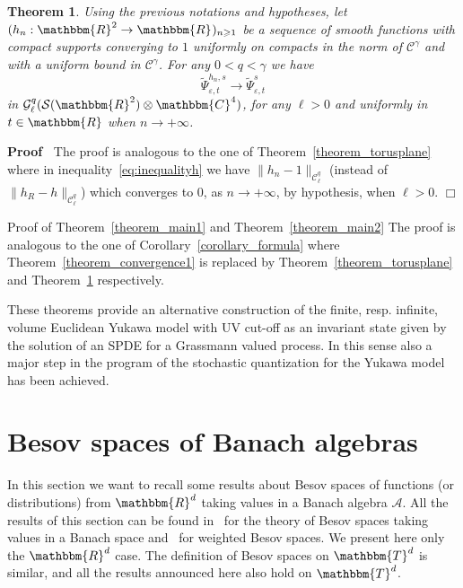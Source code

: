 \documentclass[11pt]{article}
\newenvironment{proof}{\noindent\textbf{Proof\ }}{\hspace*{\fill}$\Box$\medskip}
\newenvironment{proof*}[1]{\noindent\textbf{#1\ }}{\hspace*{\fill}$\Box$\medskip}
\newtheorem{theorem}{Theorem}
\begin{document}
\begin{theorem}
  \label{theorem_cutoffh}Using the previous notations and hypotheses, let
  $(h_n : \mathbbm{R}^2 \rightarrow \mathbbm{R}^{}_{})_{n \geqslant 1}$ be a
  sequence of smooth functions with compact supports converging to $1$
  uniformly on compacts in the norm of $\mathcal{C}^{\gamma}$ and with a
  uniform bound in $\mathcal{C}^{\gamma}$. For any $0 < q < \gamma$ we have
  \[ \tilde{\Psi}_{\varepsilon, t}^{h_n, s} \rightarrow
     \tilde{\Psi}_{\varepsilon, t}^s \]
  in $\mathcal{G}^q_{\ell} (\mathcal{S} (\mathbbm{R}^2) \otimes \mathbbm{C}^4)$,
  for any $\ell > 0$ and uniformly in $t \in \mathbbm{R}$ when $n \rightarrow +
  \infty$.
\end{theorem}

\begin{proof}
  The proof is analogous to the one of Theorem~\ref{theorem_torusplane} where
  in inequality~{\eqref{eq:inequalityh}} we have $\| h_n - 1
  \|_{\mathcal{C}^q_{\ell}}$ (instead of $\| h_R - h
  \|_{\mathcal{C}^q_{\ell}}$) which converges to $0$, as $n \rightarrow +
  \infty$, by hypothesis, when $\ell > 0$.
\end{proof}

\begin{proof*}{Proof of Theorem~\ref{theorem_main1} and
Theorem~\ref{theorem_main2}}
  The proof is analogous to the one of Corollary~\ref{corollary_formula} where
  Theorem~\ref{theorem_convergence1} is replaced by
  Theorem~\ref{theorem_torusplane} and Theorem~\ref{theorem_cutoffh}
  respectively.
\end{proof*}

These theorems provide an alternative construction of the finite, resp.
infinite, volume Euclidean Yukawa model with UV cut-off as an invariant state
given by the solution of an SPDE for a Grassmann valued process. In this sense
also a major step in the program of the stochastic quantization for the Yukawa
model has been achieved.

\appendix\section{Besov spaces of Banach algebras}\label{appendix_Besov}

In this section we want to recall some results about Besov spaces of functions
(or distributions) from $\mathbbm{R}^d$ taking values in a Banach algebra
$\mathcal{A}$. All the results of this section can be found
in~{\cite{Amann1997,Amann2019}} for the theory of Besov spaces taking values
in a Banach space and~{\cite{TriebelIII}} for weighted Besov spaces. We
present here only the $\mathbbm{R}^d$ case. The definition of Besov spaces on
$\mathbbm{T}^d$ is similar, and all the results announced here also hold on
$\mathbbm{T}^d$.
\end{document}
